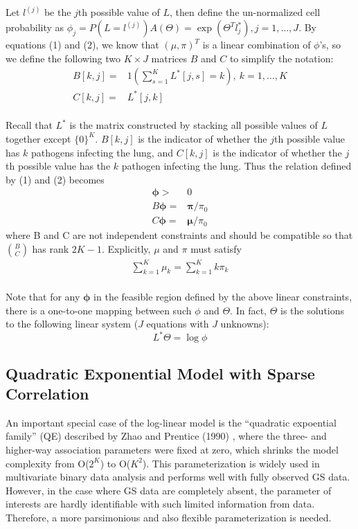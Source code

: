 \documentclass[11 pt, a4paper]{article}  %
\begin{document}
Let $l^{(j)}$ be the $j$th possible value of $L$, then define the un-normalized cell probability as $\phi_j = P(L=l^{(j)})A(\Theta) = \exp(\Theta^T l^*_j), j= 1, \ldots, J$. By equations (1) and (2), we know that $(\mu,\pi)^T$ is a linear combination of $\phi$'s, so we define the following two $K \times J$  matrices $B$ and $C$ to simplify the notation:
\begin{align*}
B[k,j] = & 1(\sum_{s=1}^K L^*[j,s]=k), \ k=1,\ldots,K \\
C[k,j] = & L^*[j,k]
\end{align*}
\\
Recall that $L^*$ is the matrix constructed by stacking all possible values of $L$ together except $\{0\}^K$. $B[k,j]$ is the indicator of whether the $j$th possible value has $k$ pathogens infecting the lung, and $C[k,j]$ is the indicator of whether the $j$th possible value has the $k$ pathogen infecting the lung. Thus the relation defined by (1) and (2) becomes
\begin{align}
\mathbf{\phi} > & 0\\
B \mathbf{\phi} = & \mathbf{\pi}/\pi_0\\ 
C \mathbf{\phi} = & \mathbf{\mu}/\pi_0
\end{align}
where B and C are not independent constraints and should be compatible so that $\binom{B}{C}$ has rank $2K-1$. Explicitly, $\mu$ and $\pi$ must satisfy 
\begin{align}
\sum_{k=1}^K \mu_k = \sum_{k=1}^K k\pi_k
\end{align} 
\\
Note that for any $\mathbf{\phi}$ in the feasible region defined by the above linear constraints, there is a one-to-one mapping between such $\phi$ and $\Theta$. In fact, $\Theta$ is the solutions to the following linear system ($J$ equations with $J$ unknowns):
\[L^*\Theta = \log \phi\]

\subsection{Quadratic Exponential Model with Sparse Correlation}
An important special case of the log-linear model is the ``quadratic expoential family'' (QE) described by Zhao and Prentice (1990) \cite{zhao1990correlated}, where the three- and higher-way association parameters were fixed at zero, which shrinks the model complexity from O($2^K$) to O($K^2$). This parameterization is widely used in multivariate binary data analysis and performs well with fully observed GS data. However, in the case where GS data are completely absent, the parameter of interests are hardly identifiable with such limited information from data. Therefore, a more parsimonious and also flexible parameterization is needed.\\
\end{document}
